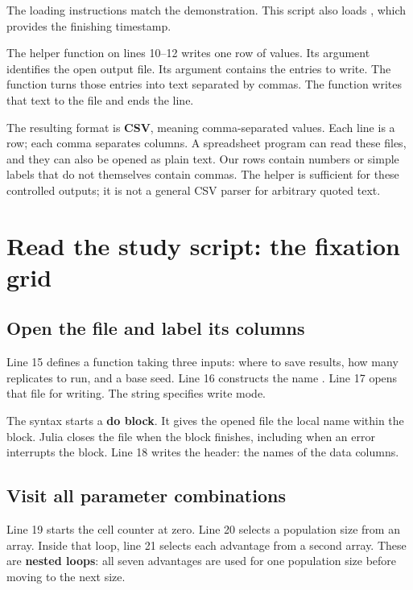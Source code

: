 The loading instructions match the demonstration. This script also loads
, which provides the finishing timestamp.

The helper function on lines 10--12 writes one row of values. Its argument
 identifies the open output file. Its argument 
contains the entries to write. The function 
turns those entries into text separated by commas. The function
 writes that text to the file and ends the line.

The resulting format is \textbf{CSV}, meaning comma-separated values.
Each line is a row; each comma separates columns. A spreadsheet program
can read these files, and they can also be opened as plain text. Our rows
contain numbers or simple labels that do not themselves contain commas.
The helper is sufficient for these controlled outputs; it is not a general
CSV parser for arbitrary quoted text.

\section{Read the study script: the fixation grid}



\subsection{Open the file and label its columns}

Line 15 defines a function taking three inputs: where to save results,
how many replicates to run, and a base seed. Line 16 constructs the name
. Line 17 opens that file for writing. The string
 specifies write mode.

The syntax  starts a \textbf{do block}. It gives the opened
file the local name  within the block. Julia closes the file
when the block finishes, including when an error interrupts the block.
Line 18 writes the header: the names of the data columns.

\subsection{Visit all parameter combinations}

Line 19 starts the cell counter at zero. Line 20 selects a population size
from an array. Inside that loop, line 21 selects each advantage from a second
array. These are \textbf{nested loops}: all seven advantages are used for
one population size before moving to the next size.

